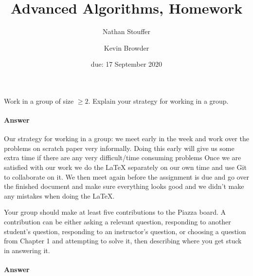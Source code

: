 \documentclass{article}
\title{Advanced Algorithms, Homework \hwnum}
\author{Nathan Stouffer \and Kevin Browder}
\date{due: 17 September 2020}
\begin{document}
\maketitle

\nextprob
{}

Work in a group of size $\geq 2$.  Explain your strategy for working in a group.

\paragraph{Answer}


Our strategy for working in a group: we meet early in the week and work over the problems on scratch paper very informally. Doing this early will give us some extra time if there are any very difficult/time consuming problems Once we are satisfied with our work we do the LaTeX separately on our own time and use Git to collaborate on it. We then meet again before the assignment is due and go over the finished document and make sure everything looks good and we didn't make any mistakes when doing the LaTeX.


\nextprob
{}

Your group should make at least five contributions to the Piazza board.  A
contribution can be either asking a relevant question, responding to another
student's question, responding to an instructor's question, or choosing a
question from Chapter 1 and attempting to solve it, then  describing where you
get stuck in answering it.

\paragraph{Answer}

\end{document}
